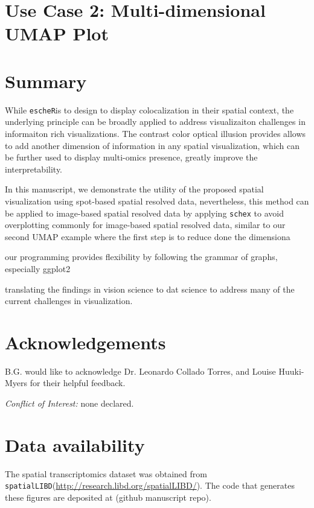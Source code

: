 \documentclass[11pt]{article}
\newcommand{\fixme}[1]{{\color{red} (#1)}}
\newcommand{\coloc}{\texttt{escheR}}
\begin{document}
\section*{Use Case 2: Multi-dimensional UMAP Plot}


\section*{Summary}

While \coloc is to design to display colocalization in their spatial context, the underlying principle can be broadly applied to address visualizaiton challenges in informaiton rich visualizations. The contrast color optical illusion provides allows to add another dimension of information in any spatial visualization, which can be further used to display multi-omics presence, greatly improve the interpretability. 

In this manuscript, we demonstrate the utility of the proposed spatial visualization using spot-based spatial resolved data, nevertheless, this method can be applied to image-based spatial resolved data by applying \texttt{schex} to avoid overplotting commonly for image-based spatial resolved data, similar to our second UMAP example where the first step is to reduce done the dimensiona

our programming provides flexibility by following the grammar of graphs, especially ggplot2


translating the findings in vision science to dat science to address many of the current challenges in visualization.


\section*{Acknowledgements}
B.G. would like to acknowledge Dr. Leonardo Collado Torres,  and Louise Huuki-Myers for their helpful feedback.

\vspace{0.2in}
\noindent \textit{Conflict of Interest:} none declared.

\section*{Data availability}
The spatial transcriptomics dataset was obtained from \texttt{spatialLIBD}(\url{http://research.libd.org/spatialLIBD/}). The code that generates these figures are deposited at \fixme{github manuscript repo}.
\end{document}
